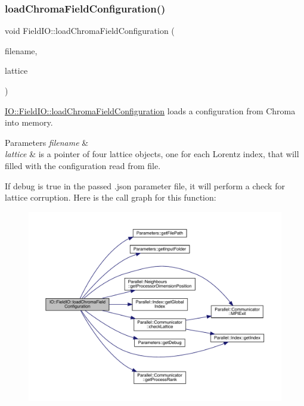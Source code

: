 \subsubsection{\texorpdfstring{loadChromaFieldConfiguration()}{loadChromaFieldConfiguration()}}
{\footnotesize\ttfamily void Field\+I\+O\+::load\+Chroma\+Field\+Configuration (\begin{DoxyParamCaption}\item[{std\+::string}]{filename,  }\item[{\mbox{\hyperlink{class_lattice}{Lattice}}$<$ \mbox{\hyperlink{class_s_u3}{S\+U3}} $>$ $\ast$}]{lattice }\end{DoxyParamCaption})\hspace{0.3cm}{\ttfamily [static]}}



\mbox{\hyperlink{class_i_o_1_1_field_i_o_af23fb6e02a6bd1cafd5be4acacbf848e}{I\+O\+::\+Field\+I\+O\+::load\+Chroma\+Field\+Configuration}} loads a configuration from Chroma into memory. 


\begin{DoxyParams}{Parameters}
{\em filename} & \\
\hline
{\em lattice} & is a pointer of four lattice objects, one for each Lorentz index, that will filled with the configuration read from file.\\
\hline
\end{DoxyParams}
If debug is true in the passed .json parameter file, it will perform a check for lattice corruption. Here is the call graph for this function\+:\nopagebreak
\begin{figure}[H]
\begin{center}
\leavevmode
\includegraphics[width=350pt]{class_i_o_1_1_field_i_o_af23fb6e02a6bd1cafd5be4acacbf848e_cgraph}
\end{center}
\end{figure}
\mbox{\label{class_i_o_1_1_field_i_o_a02db864a48601edd7febaab5d655e495}} 
